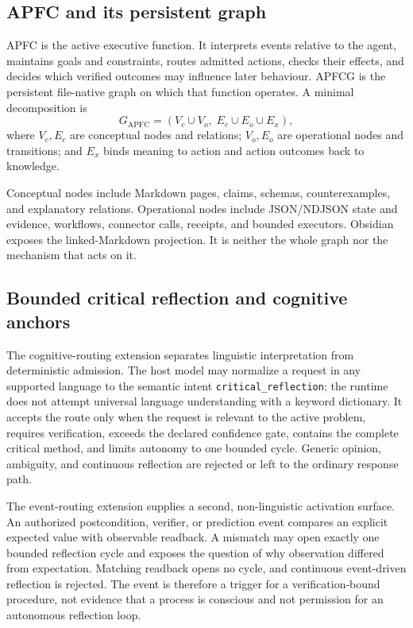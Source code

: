 \documentclass[10pt,twocolumn]{article}
\theoremstyle{definition}
\theoremstyle{plain}
\theoremstyle{remark}
\newcommand{\file}[1]{\nolinkurl{#1}}
\begin{document}
\subsection{APFC and its persistent graph}

APFC is the active executive function.  It interprets events relative to the agent, maintains goals and constraints, routes admitted actions, checks their effects, and decides which verified outcomes may influence later behaviour.  APFCG is the persistent file-native graph on which that function operates.  A minimal decomposition is
\begin{equation}
G_{\mathrm{APFC}}=(V_c\cup V_o,\;E_c\cup E_o\cup E_x),
\label{eq:apfcg}
\end{equation}
where $V_c,E_c$ are conceptual nodes and relations; $V_o,E_o$ are operational nodes and transitions; and $E_x$ binds meaning to action and action outcomes back to knowledge.

Conceptual nodes include Markdown pages, claims, schemas, counterexamples, and explanatory relations.  Operational nodes include JSON/NDJSON state and evidence, workflows, connector calls, receipts, and bounded executors.  Obsidian exposes the linked-Markdown projection.  It is neither the whole graph nor the mechanism that acts on it.

\subsection{Bounded critical reflection and cognitive anchors}
\label{sec:critical-routing}

The cognitive-routing extension separates linguistic interpretation from deterministic admission.  The host model may normalize a request in any supported language to the semantic intent \file{critical_reflection}; the runtime does not attempt universal language understanding with a keyword dictionary.  It accepts the route only when the request is relevant to the active problem, requires verification, exceeds the declared confidence gate, contains the complete critical method, and limits autonomy to one bounded cycle.  Generic opinion, ambiguity, and continuous reflection are rejected or left to the ordinary response path.

The event-routing extension supplies a second, non-linguistic activation surface.  An authorized postcondition, verifier, or prediction event compares an explicit expected value with observable readback.  A mismatch may open exactly one bounded reflection cycle and exposes the question of why observation differed from expectation.  Matching readback opens no cycle, and continuous event-driven reflection is rejected.  The event is therefore a trigger for a verification-bound procedure, not evidence that a process is conscious and not permission for an autonomous reflection loop.
\end{document}
